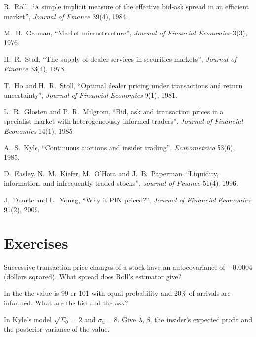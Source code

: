\begin{omsources}
\item R.~Roll, ``A simple implicit measure of the effective bid-ask spread in an efficient market'', \emph{Journal of Finance} 39(4), 1984.
\item M.~B.~Garman, ``Market microstructure'', \emph{Journal of Financial Economics} 3(3), 1976.
\item H.~R.~Stoll, ``The supply of dealer services in securities markets'', \emph{Journal of Finance} 33(4), 1978.
\item T.~Ho and H.~R.~Stoll, ``Optimal dealer pricing under transactions and return uncertainty'', \emph{Journal of Financial Economics} 9(1), 1981.
\item L.~R.~Glosten and P.~R.~Milgrom, ``Bid, ask and transaction prices in a specialist market with heterogeneously informed traders'', \emph{Journal of
Financial Economics} 14(1), 1985.
\item A.~S.~Kyle, ``Continuous auctions and insider trading'', \emph{Econometrica} 53(6), 1985.
\item D.~Easley, N.~M.~Kiefer, M.~O'Hara and J.~B.~Paperman, ``Liquidity, information, and infrequently traded stocks'', \emph{Journal of Finance} 51(4), 1996.
\item J.~Duarte and L.~Young, ``Why is PIN priced?'', \emph{Journal of Financial Economics} 91(2), 2009.
\end{omsources}

\section{Exercises}

\begin{exercise}[$\star$]\label{exo:mx:why-there-is-a-spread:1}
Successive transaction-price changes of a stock have an autocovariance of $-0.0004$ (dollars squared). What spread does Roll's estimator give?
\end{exercise}

\begin{exercise}[$\star$]\label{exo:mx:why-there-is-a-spread:2}
In the  the value is 99 or 101 with equal probability and 20\% of arrivals are informed. What are the bid and the ask?
\end{exercise}

\begin{exercise}[$\star$]\label{exo:mx:why-there-is-a-spread:3}
In Kyle's model $\sqrt{\Sigma_0}=2$ and $\sigma_u=8$. Give $\lambda$, $\beta$, the insider's expected profit and the posterior variance of the value.
\end{exercise}

